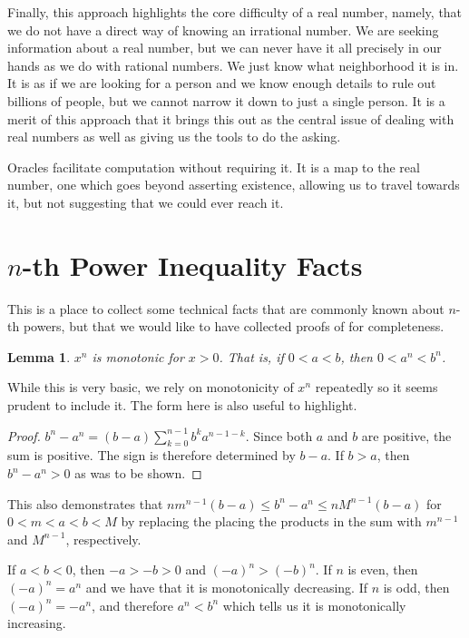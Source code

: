\documentclass[12pt]{article}
\newtheorem{lemma}{Lemma}[subsection]
\begin{document}
Finally, this approach highlights the core difficulty of a real number, namely, that we do not have a direct way of knowing an irrational number. We are seeking information about a real number, but we can never have it all precisely in our hands as we do with rational numbers. We just know what neighborhood it is in. It is as if we are looking for a person and we know enough details to rule out billions of people, but we cannot narrow it down to just a single person. It is a merit of this approach that it brings this out as the central issue of dealing with real numbers as well as giving us the tools to do the asking. 

Oracles facilitate computation without requiring it. It is a map to the real number, one which goes beyond asserting existence, allowing us to travel towards it, but not suggesting that we could ever reach it. 

\appendix

\section{\texorpdfstring{$n$}{n}-th Power Inequality Facts}\label{app:A}

This is a place to collect some technical facts that are commonly known about $n$-th powers, but that we would like to have collected proofs of for completeness.

\begin{lemma}
$x^n$ is monotonic for $x>0$. That is, if $0 < a < b$, then $0 < a^n<b^n$.
\end{lemma}

While this is very basic, we rely on monotonicity of $x^n$ repeatedly so it seems prudent to include it. The form here is also useful to highlight. 

\begin{proof}
$b^n-a^n= (b-a)\sum_{k=0}^{n-1} b^k a^{n-1-k}$. Since both $a$ and $b$ are positive, the sum is positive. The sign is therefore determined by $b-a$. If $b>a$, then $b^n-a^n > 0$ as was to be shown. 
\end{proof}

This also demonstrates that $ n m^{n-1} (b-a) \leq  b^n -a^n \leq n M^{n-1} (b-a)$ for $0 < m < a< b< M$ by replacing the placing the products in the sum with $m^{n-1}$ and $M^{n-1}$, respectively. 

If $ a< b< 0$, then $-a > -b > 0$ and $(-a)^n > (-b)^n$. If $n$ is even, then $(-a)^n = a^n$ and we have that it is monotonically decreasing. If $n$ is odd, then $(-a)^n = -a^n$, and therefore $a^n < b^n$ which tells us it is monotonically increasing. 
\end{document}
